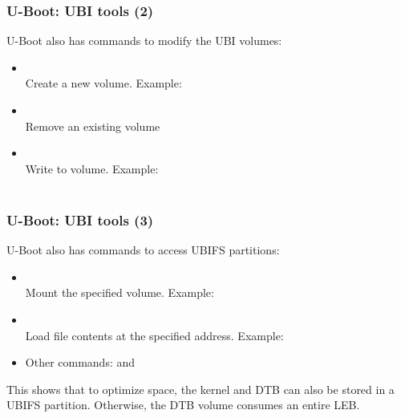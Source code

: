 \begin{frame}
  \frametitle{U-Boot: UBI tools (2)}
  U-Boot also has commands to modify the UBI volumes:
    \begin{itemize}
    \item {}\\
	Create a new volume. Example:\\
    \item {}\\
	Remove an existing volume
    \item {}\\
        Write to volume. Example:\\
	\\
    \end{itemize}
\end{frame}

\begin{frame}
  \frametitle{U-Boot: UBI tools (3)}
  U-Boot also has commands to access UBIFS partitions:
    \begin{itemize}
    \item {}\\
	Mount the specified volume. Example:\\
    \item {}\\
	Load file contents at the specified address. Example:\\
    \item Other commands:  and 
    \end{itemize}
    This shows that to optimize space, the kernel and DTB can
    also be stored in a UBIFS partition. Otherwise, the DTB volume
    consumes an entire LEB.
\end{frame}

